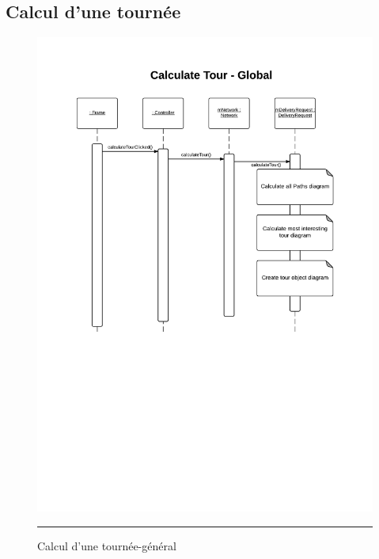 \subsection{Calcul d'une tournée}
\begin{figure}[H]
	\centering
		\includegraphics[width=\textwidth,height=\textheight,keepaspectratio]{Figures/calcul_tournee1}
		\rule{35em}{0.5pt}
	\caption[Calcul d'une tournée-général]{Calcul d'une tournée-général}
\end{figure}

